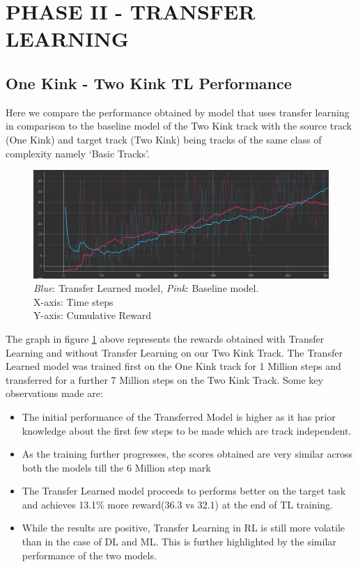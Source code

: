 \section{PHASE II - TRANSFER LEARNING}

\subsection{One Kink - Two Kink TL Performance}

Here we compare the performance obtained by model that uses transfer learning in comparison to the baseline model of the Two Kink track with the source track (One Kink) and target track (Two Kink) being tracks of the same class of complexity namely `Basic Tracks'.

\begin{figure}[H]
    \centering
    \includegraphics[width=1.0\textwidth]{images/graphs/TL-OneKink-TwoKink.png}
    \caption{\centering \textit{Blue}: Transfer Learned model, \textit{Pink}: Baseline model. \\ X-axis: Time steps \\ Y-axis: Cumulative Reward }
    \label{TL-OneKink-TwoKink}
\end{figure}
The graph in figure \ref{TL-OneKink-TwoKink} above represents the rewards obtained with Transfer Learning and without Transfer Learning on our Two Kink Track. The Transfer Learned model was trained first on the One Kink track for 1 Million steps and transferred for a further 7 Million steps on the Two Kink Track. Some key observations made are:
\begin{itemize}
\item The initial performance of the Transferred Model is higher as it has prior knowledge about the first few steps to be made which are track independent.
\item As the training further progresses, the scores obtained are very similar across both the models till the 6 Million step mark
\item The Transfer Learned model proceeds to performs better on the target task and achieves  13.1\% more reward(36.3 vs 32.1)  at the end of TL training.
\item While the results are positive, Transfer Learning in RL is still more volatile than in the case of DL and ML. This is further highlighted by the similar performance of the two models.
\end{itemize}


